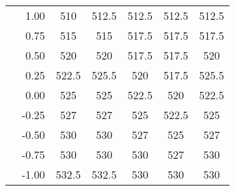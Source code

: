 \begin{tabular}{l | r | ccccc}
    & 1.00  & \cellcolor{white!92!gray}510    & \cellcolor{white!84!gray}512.5  & \cellcolor{white!84!gray}512.5  & \cellcolor{white!84!gray}512.5  & \cellcolor{white!84!gray}512.5  \\
    & 0.75  & \cellcolor{white!76!gray}515    & \cellcolor{white!76!gray}515    & \cellcolor{white!68!gray}517.5  & \cellcolor{white!68!gray}517.5  & \cellcolor{white!68!gray}517.5  \\
    & 0.50  & \cellcolor{white!60!gray}520    & \cellcolor{white!60!gray}520    & \cellcolor{white!68!gray}517.5  & \cellcolor{white!68!gray}517.5  & \cellcolor{white!60!gray}520    \\
    & 0.25  & \cellcolor{white!52!gray}522.5  & \cellcolor{white!36!gray}525.5  & \cellcolor{white!60!gray}520    & \cellcolor{white!68!gray}517.5  & \cellcolor{white!36!gray}525.5  \\
    & 0.00  & \cellcolor{white!44!gray}525    & \cellcolor{white!44!gray}525    & \cellcolor{white!52!gray}522.5  & \cellcolor{white!60!gray}520    & \cellcolor{white!52!gray}522.5  \\
    & -0.25 & \cellcolor{white!28!gray}527    & \cellcolor{white!20!gray}527    & \cellcolor{white!44!gray}525    & \cellcolor{white!52!gray}522.5  & \cellcolor{white!44!gray}525    \\
    & -0.50  & \cellcolor{white!12!gray}530    & \cellcolor{white!12!gray}530    & \cellcolor{white!20!gray}527    & \cellcolor{white!44!gray}525    & \cellcolor{white!20!gray}527    \\
    & -0.75 & \cellcolor{white!12!gray}530    & \cellcolor{white!12!gray}530    & \cellcolor{white!12!gray}530    & \cellcolor{white!20!gray}527    & \cellcolor{white!12!gray}530    \\
    & -1.00 & \cellcolor{white!8!gray}532.5   & \cellcolor{white!8!gray}532.5   & \cellcolor{white!12!gray}530    & \cellcolor{white!12!gray}530    & \cellcolor{white!12!gray}530    \\
\hline\hline
\end{tabular}
